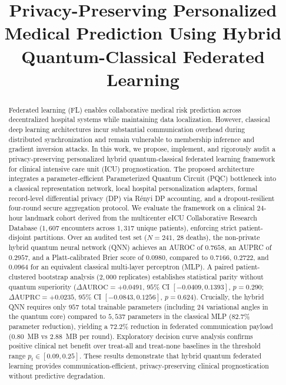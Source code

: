 \documentclass[conference]{IEEEtran}
\begin{document}
\title{Privacy-Preserving Personalized Medical Prediction Using Hybrid Quantum-Classical Federated Learning}

\author{
}

\maketitle

\begin{abstract}
Federated learning (FL) enables collaborative medical risk prediction across decentralized hospital systems while maintaining data localization. However, classical deep learning architectures incur substantial communication overhead during distributed synchronization and remain vulnerable to membership inference and gradient inversion attacks. In this work, we propose, implement, and rigorously audit a privacy-preserving personalized hybrid quantum-classical federated learning framework for clinical intensive care unit (ICU) prognostication. The proposed architecture integrates a parameter-efficient Parameterized Quantum Circuit (PQC) bottleneck into a classical representation network, local hospital personalization adapters, formal record-level differential privacy (DP) via Rényi DP accounting, and a dropout-resilient four-round secure aggregation protocol. We evaluate the framework on a clinical 24-hour landmark cohort derived from the multicenter eICU Collaborative Research Database ($1,607$ encounters across $1,317$ unique patients), enforcing strict patient-disjoint partitions. Over an audited test set ($N=241$, $28$ deaths), the non-private hybrid quantum neural network (QNN) achieves an AUROC of $0.7658$, an AUPRC of $0.2957$, and a Platt-calibrated Brier score of $0.0980$, compared to $0.7166$, $0.2722$, and $0.0964$ for an equivalent classical multi-layer perceptron (MLP). A paired patient-clustered bootstrap analysis ($2,000$ replicates) establishes statistical parity without quantum superiority ($\Delta\text{AUROC} = +0.0491$, $95\%$ CI $[-0.0409, 0.1393]$, $p=0.290$; $\Delta\text{AUPRC} = +0.0235$, $95\%$ CI $[-0.0843, 0.1256]$, $p=0.624$). Crucially, the hybrid QNN requires only $957$ total trainable parameters (including $24$ variational angles in the quantum core) compared to $5,537$ parameters in the classical MLP ($82.7\%$ parameter reduction), yielding a $72.2\%$ reduction in federated communication payload ($0.80$~MB vs $2.88$~MB per round). Exploratory decision curve analysis confirms positive clinical net benefit over treat-all and treat-none baselines in the threshold range $p_t \in [0.09, 0.25]$. These results demonstrate that hybrid quantum federated learning provides communication-efficient, privacy-preserving clinical prognostication without predictive degradation.
\end{abstract}
\end{document}
